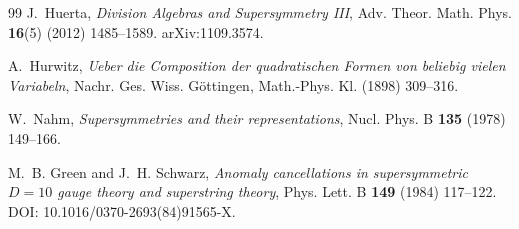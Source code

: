\documentclass[11pt,a4paper]{article}
\theoremstyle{definition}
\theoremstyle{remark}
\begin{document}
\begin{thebibliography}{99}
J.~Huerta,
\emph{Division Algebras and Supersymmetry III},
Adv. Theor. Math. Phys. {\bf 16}(5) (2012) 1485--1589.
arXiv:1109.3574.

A.~Hurwitz,
\emph{Ueber die Composition der quadratischen Formen von beliebig vielen Variabeln},
Nachr. Ges. Wiss. G\"ottingen, Math.-Phys. Kl. (1898) 309--316.

W.~Nahm,
\emph{Supersymmetries and their representations},
Nucl. Phys. B {\bf 135} (1978) 149--166.

M.~B. Green and J.~H. Schwarz,
\emph{Anomaly cancellations in supersymmetric $D = 10$ gauge theory and superstring theory},
Phys. Lett. B {\bf 149} (1984) 117--122.
DOI: 10.1016/0370-2693(84)91565-X.

\end{thebibliography}
\end{document}
